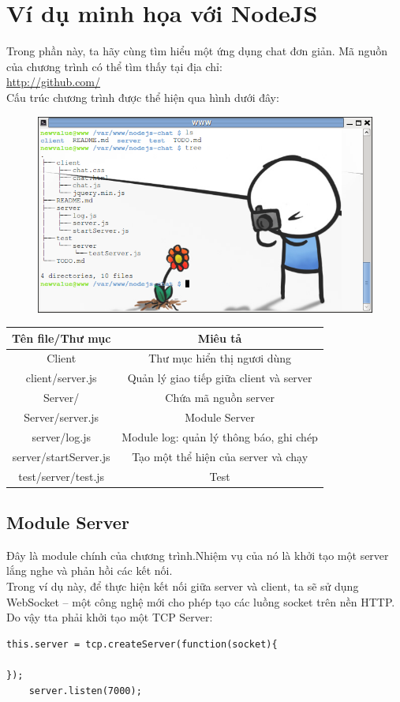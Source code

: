 ﻿\chapter{Ví dụ minh họa với NodeJS}
Trong phần này, ta hãy cùng tìm hiểu một ứng dụng chat đơn giản. Mã nguồn của chương trình có thể tìm thấy tại địa chỉ:\\
	\url{http://github.com/}\\
Cấu trúc chương trình được thể hiện qua hình dưới đây:\\
	\begin{figure}[-h]
		\centering
		\includegraphics[scale=0.7]{4_1}
	\end{figure}
	
	\begin{tabular}{|c|c|}
		\hline
		Tên file/Thư mục & Miêu tả \\
		\hline
		Client & Thư mục hiển thị ngươi dùng \\
		\hline
		client/server.js & Quản lý giao tiếp giữa client và server \\
		\hline
		Server/ & Chứa mã nguồn server \\
		\hline
		Server/server.js & Module Server \\
		\hline
		server/log.js &	Module log: quản lý thông báo, ghi chép \\
		\hline
		server/startServer.js &	Tạo một thể hiện của server và chạy \\
		\hline
		test/server/test.js & Test \\
		\hline
	\end{tabular}
	
\section{Module Server}
	Đây là module chính của chương trình.Nhiệm vụ của nó là khởi tạo một server lắng nghe và phản hồi các kết nối.\\
	Trong ví dụ này, để thực hiện kết nối giữa server và client, ta sẽ sử dụng WebSocket – một công nghệ mới cho phép tạo các luồng socket trên nền HTTP. Do vậy tta phải khởi tạo một TCP Server:\\
	\begin{verbatim}
this.server = tcp.createServer(function(socket){

});
	server.listen(7000);
	\end{verbatim}
	
